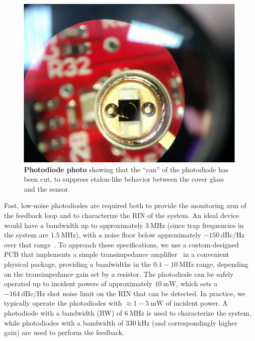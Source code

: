 \documentclass[twocolumn,aps,pra,showpacs,preprintnumbers,bibnotes]{revtex4-1}
\newcommand\unit[2]{\ensuremath{#1~\mathrm{{#2}}}}
\begin{document}
\begin{figure}
  \begin{center}
    \includegraphics[width=\columnwidth]{Figure8.jpg}
    \caption{\textbf{Photodiode photo} showing that the ``can'' of the photodiode has been cut, to suppress etalon-like behavior between the cover glass and the sensor.}\label{fig:cut_pd}
  \end{center}
\end{figure}

Fast, low-noise photodiodes are required both to provide the monitoring arm of the feedback loop and to characterize the RIN of the system.
An ideal device would have a bandwidth up to approximately \unit{3}{MHz} (since trap frequencies in the system are \unit{1.5}{MHz}), with a noise floor below approximately \unit{-150}{dBc/Hz} over that range~\cite{Blatt2015}.
To approach these specifications, we use a custom-designed PCB that implements a simple transimpedance amplifier~\cite{Graeme1995} in a convenient physical package, providing a bandwidths in the \unit{0.1-10}{MHz} range, depending on the transimpedance gain set by a resistor.
The photodiode can be safely operated up to incident powers of approximately \unit{10}{mW}, which sets a \unit{-164}{dBc/Hz} shot noise limit on the RIN that can be detected.
In practice, we typically operate the photodiodes with $\approx$\unit{1-5}{mW} of incident power.
A photodiode with a bandwidth (BW) of \unit{6}{MHz} is used to characterize the system, while photodiodes with a bandwidth of \unit{330}{kHz} (and correspondingly higher gain) are used to perform the feedback.
\end{document}

